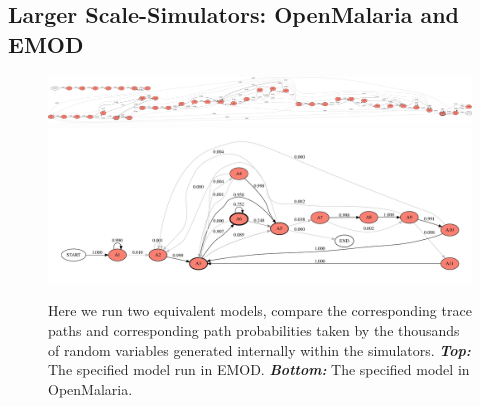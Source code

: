 \documentclass{article}
\begin{document}
\subsection{Larger Scale-Simulators: OpenMalaria and EMOD}

\begin{figure}[h!]
  \centering
  \includegraphics[width=\textwidth]{../plots/final_emod_traces__rotated.pdf}
  \includegraphics[width=\textwidth]{../plots/ewan_25_pop_100.pdf}
  \caption{Here we run two equivalent models, compare the corresponding trace paths and corresponding 
  path probabilities taken by the thousands of random variables generated internally within the simulators. \textit{\textbf{Top:}} The specified model run in EMOD. \textit{\textbf{Bottom:}} The specified model in OpenMalaria.}
  \label{fig:plotewan}
\end{figure}
\end{document}
